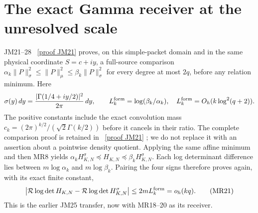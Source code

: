 \documentclass[11pt]{article}
\begin{document}
\section{The exact Gamma receiver at the unresolved scale}
JM21--28 \cite{JM}%
~\href{https://github.com/KokunoYumeto/zeta-function-research-reader/blob/5992ad50c0f2a06921f1fcaded7b4e38097c0739/workbenches/splitzero-tandem/continuations/20260920-original-kernel-mixed-determinants/providers/JOINT_MINIMUM_RECEIVERS.tex\#L286}{[proof JM21]}%
{} proves, on this simple-packet domain and in the
same physical coordinate $S=c+iy$, a full-source comparison
$\alpha_k\|P\|_\sigma^2\le\|P\|_\mu^2\le\beta_k\|P\|_\sigma^2$
for every degree at most $2q$, before any relation minimum. Here
\[
 \sigma(y)\,dy=\frac{|\Gamma(1/4+iy/2)|^2}{2\pi}\,dy,
 \qquad L_k^{\rm form}=\log(\beta_k/\alpha_k),
 \quad L_k^{\rm form}=O_h(k\log^2(q+2)).
\]
The positive constants include the exact convolution mass
$c_k=(2\pi)^{k/2}/(\sqrt2\Gamma(k/2))$ before it cancels in their
ratio. The complete comparison proof is retained in \cite{JM}%
~\href{https://github.com/KokunoYumeto/zeta-function-research-reader/blob/5992ad50c0f2a06921f1fcaded7b4e38097c0739/workbenches/splitzero-tandem/continuations/20260920-original-kernel-mixed-determinants/providers/JOINT_MINIMUM_RECEIVERS.tex\#L286}{[proof JM21]}%
{}; we
do not replace it with an assertion about a pointwise density quotient.
Applying the same affine minimum and then MR8 yields
$\alpha_k H_{K,N}^\sigma\preceq H_{K,N}\preceq\beta_k H_{K,N}^\sigma$.
Each log determinant difference lies between $m\log\alpha_k$ and
$m\log\beta_k$. Pairing the four signs therefore proves again, with
its exact finite constant,
\[
 \left|\mathcal R\log\det H_{K,N}
       -\mathcal R\log\det H_{K,N}^\sigma\right|
       \le2mL_k^{\rm form}=o_h(kq).\tag{MR21}
\]
This is the earlier JM25 transfer, now with MR18--20 as its receiver.
\end{document}
